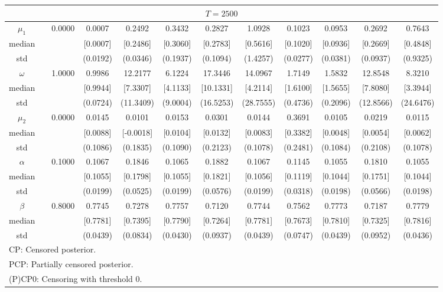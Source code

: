 {\begin{sidewaystable}
\begin{tabular}{cc cc cccc cccc}
\hline 
\multicolumn{12}{c}{$T =2500$}  \\ 
\hline 
$\mu_{1}$&& 0.0000 & 0.0007 & 0.2492 & 0.3432 & 0.2827 & 1.0928 & 0.1023 & 0.0953 & 0.2692 & 0.7643  \\ 
median &&  & [0.0007] & [0.2486] & [0.3060] & [0.2783] & [0.5616] & [0.1020] & [0.0936] & [0.2669] & [0.4848]  \\ 
std &&   & (0.0192) & (0.0346) & (0.1937) & (0.1094) & (1.4257) &(0.0277) & (0.0381) & (0.0937) & (0.9325)  \\ 
$\omega$&& 1.0000 & 0.9986 & 12.2177 & 6.1224 & 17.3446 & 14.0967 & 1.7149 & 1.5832 & 12.8548 & 8.3210  \\ 
median &&  & [0.9944] & [7.3307] & [4.1133] & [10.1331] & [4.2114] & [1.6100] & [1.5655] & [7.8080] & [3.3944]  \\ 
std &&   & (0.0724) & (11.3409) & (9.0004) & (16.5253) & (28.7555) &(0.4736) & (0.2096) & (12.8566) & (24.6476)  \\ 
$\mu_{2}$&& 0.0000 & 0.0145 & 0.0101 & 0.0153 & 0.0301 & 0.0144 & 0.3691 & 0.0105 & 0.0219 & 0.0115  \\ 
median &&  & [0.0088] & [-0.0018] & [0.0104] & [0.0132] & [0.0083] & [0.3382] & [0.0048] & [0.0054] & [0.0062]  \\ 
std &&   & (0.1086) & (0.1835) & (0.1090) & (0.2123) & (0.1078) &(0.2481) & (0.1084) & (0.2108) & (0.1078)  \\ 
$\alpha$&& 0.1000 & 0.1067 & 0.1846 & 0.1065 & 0.1882 & 0.1067 & 0.1145 & 0.1055 & 0.1810 & 0.1055  \\ 
median &&  & [0.1055] & [0.1798] & [0.1055] & [0.1821] & [0.1056] & [0.1119] & [0.1044] & [0.1751] & [0.1044]  \\ 
std &&   & (0.0199) & (0.0525) & (0.0199) & (0.0576) & (0.0199) &(0.0318) & (0.0198) & (0.0566) & (0.0198)  \\ 
$\beta$&& 0.8000 & 0.7745 & 0.7278 & 0.7757 & 0.7120 & 0.7744 & 0.7562 & 0.7773 & 0.7187 & 0.7779  \\ 
median &&  & [0.7781] & [0.7395] & [0.7790] & [0.7264] & [0.7781] & [0.7673] & [0.7810] & [0.7325] & [0.7816]  \\ 
std &&   & (0.0439) & (0.0834) & (0.0430) & (0.0937) & (0.0439) &(0.0747) & (0.0439) & (0.0952) & (0.0436)  \\ 
\hline 
\multicolumn{12}{l}{\footnotesize{CP: Censored posterior.}}  \\ 
\multicolumn{12}{l}{\footnotesize{PCP: Partially censored posterior.}} \\ 
\multicolumn{12}{l}{\footnotesize{(P)CP0: Censoring with threshold 0.}} \\ 

\end{tabular}
\end{sidewaystable}}
